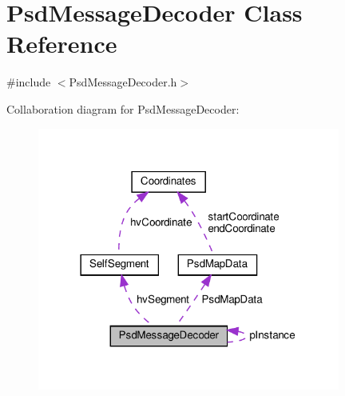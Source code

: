 \hypertarget{class_psd_message_decoder}{}\section{Psd\+Message\+Decoder Class Reference}
\label{class_psd_message_decoder}


{\ttfamily \#include $<$Psd\+Message\+Decoder.\+h$>$}



Collaboration diagram for Psd\+Message\+Decoder\+:\nopagebreak
\begin{figure}[H]
\begin{center}
\leavevmode
\includegraphics[width=282pt]{class_psd_message_decoder__coll__graph}
\end{center}
\end{figure}
